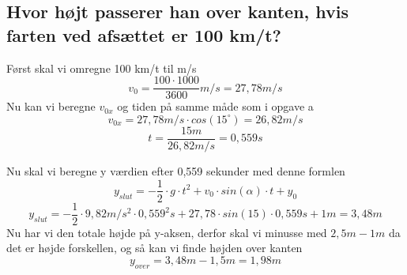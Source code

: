 \subsection{Hvor højt passerer han over kanten, hvis farten ved afsættet er 100 km/t?}
Først skal vi omregne 100 km/t til m/s
\begin{equation*}
    v_{0}=\frac{100\cdot 1000}{3600}m/s = 27,78m/s
\end{equation*}
Nu kan vi beregne \begin{math}v_{0x}\end{math} og tiden på samme måde som i opgave a
\begin{equation*}
    v_{0x}=27,78m/s\cdot cos(15^{\circ}) = 26,82 m/s
\end{equation*}
\begin{equation*}
    t=\frac{15m}{26,82m/s} = 0,559 s
\end{equation*}

Nu skal vi beregne y værdien efter 0,559 sekunder med denne formlen
\begin{equation*}
    y_{slut} = -\frac{1}{2}\cdot g\cdot t^{2} + v_{0}\cdot sin(\alpha)\cdot t + y_{0}
\end{equation*}
\begin{equation*}
    y_{slut} = -\frac{1}{2}\cdot 9,82m/s^{2}\cdot 0,559^{2} s + 27,78\cdot sin(15)\cdot 0,559s + 1m = 3,48m
\end{equation*}
Nu har vi den totale højde på y-aksen, derfor skal vi minusse med \begin{math}2,5m - 1m\end{math} da det er højde forskellen, og så kan vi finde højden over kanten
\begin{equation*}
    y_{over} = 3,48m - 1,5m = 1,98m
\end{equation*}
\newpage